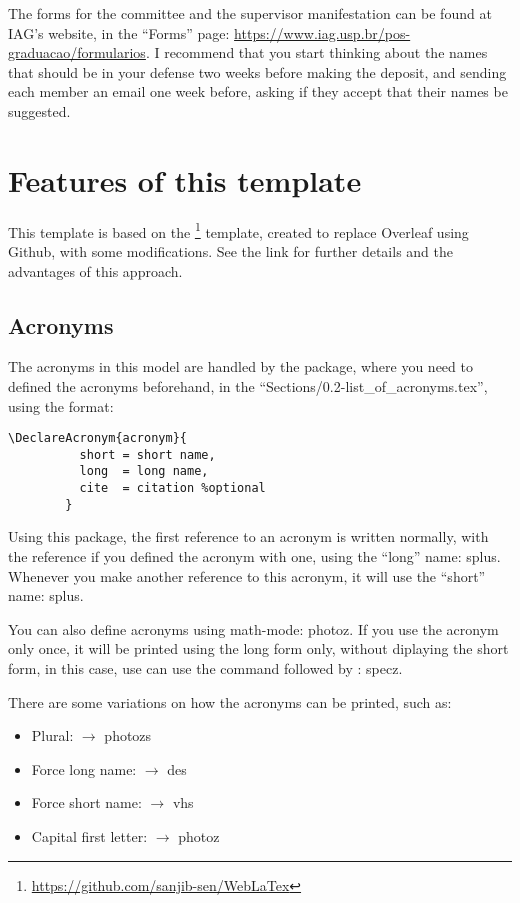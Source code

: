   The forms for the committee and the supervisor manifestation can be found at IAG's website, in the ``Forms'' page: \url{https://www.iag.usp.br/pos-graduacao/formularios}. I recommend that you start thinking about the names that should be in your defense two weeks before making the deposit, and sending each member an email one week before, asking if they accept that their names be suggested.

  \section{Features of this template}

    This template is based on the \footnote{\url{https://github.com/sanjib-sen/WebLaTex}} template, created to replace Overleaf using Github, with some modifications. See the link for further details and the advantages of this approach.
  
    \subsection{Acronyms}
      The acronyms in this model are handled by the  package, where you need to defined the acronyms beforehand, in the ``Sections/0.2-list\_of\_acronyms.tex'', using the format:

      \begin{lstlisting}[autogobble]
        \DeclareAcronym{acronym}{
          short = short name,
          long  = long name,
          cite  = citation %optional
        }
    \end{lstlisting}

    Using this package, the first reference to an acronym is written normally, with the reference if you defined the acronym with one, using the ``long'' name: \ac{splus}. Whenever you make another reference to this acronym, it will use the ``short'' name: \ac{splus}.
    
    You can also define acronyms using math-mode: \ac{photoz}. If you use the acronym only once, it will be printed using the long form only, without diplaying the short form, in this case, use can use the  command followed by  : \ac{specz}.

    There are some variations on how the acronyms can be printed, such as:
    \begin{itemize}
      \item Plural:  $\rightarrow$ \acp{photoz}
      \item Force long name:  $\rightarrow$ \acl{des}
      \item Force short name:  $\rightarrow$ \acs{vhs}
      \item Capital first letter:  $\rightarrow$ \Ac{photoz}
    \end{itemize}

